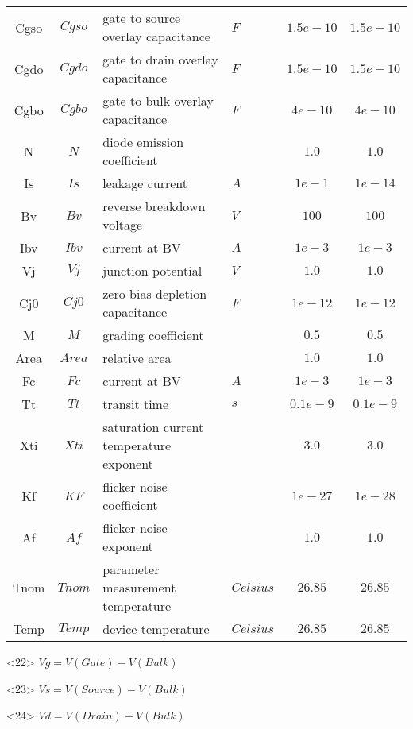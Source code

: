 \begin{scriptsize}
\begin{longtable}{ccllcc}
Cgso  & $Cgso$ & gate to source overlay capacitance  &  $F$  & $1.5e-10$ & $1.5e-10$ \\
Cgdo  & $Cgdo$ & gate to drain overlay capacitance  &  $F$  & $1.5e-10$ & $1.5e-10$ \\
Cgbo  & $Cgbo$ & gate to bulk overlay capacitance  &  $F$  & $4e-10$ & $4e-10$ \\
N  & $N$ & diode emission coefficient  &    & $1.0$ & $1.0$ \\
Is  & $Is$ & leakage current  & $A$   & $1e-1$ & $1e-14$ \\
Bv  & $Bv$ & reverse breakdown voltage  &  $V$  & $100$ & $100$ \\
Ibv & $Ibv$ & current at BV  &  $A$   & $1e-3$ & $1e-3$ \\
Vj  & $Vj$ & junction potential  & $V$   & $1.0$ & $1.0$ \\
Cj0  & $Cj0$ & zero bias depletion capacitance  &  $F$  & $1e-12$ & $1e-12$ \\
M    & $M$ & grading coefficient  &     & $0.5$ & $0.5$ \\
Area & $Area$ & relative area  &    & $1.0$ & $1.0$ \\
Fc & $Fc$ & current at BV  &  $A$   & $1e-3$ & $1e-3$ \\
Tt  & $Tt$ & transit time  & $s$   & $0.1e-9$ & $0.1e-9$ \\
Xti  & $Xti$ & saturation current temperature exponent  &    & $3.0$ & $3.0$ \\
Kf   & $KF$  & flicker noise coefficient                &    & $1e-27$ & $1e-28$ \\
Af   & $Af$  & flicker noise exponent                   &    & $1.0$ & $1.0$ \\
Tnom & $Tnom$ & parameter measurement temperature  & $Celsius$    & $26.85$ & $26.85$ \\
Temp & $Temp$ & device temperature  & $Celsius$   & $26.85$ & $26.85$ \\

\end{longtable}
\end{scriptsize}

<22>  \hspace{10mm} $Vg = V(Gate)-V(Bulk)$

<23>  \hspace{10mm} $Vs=V(Source)-V(Bulk)$

<24> \hspace{10mm}  $Vd=V(Drain)-V(Bulk)$

